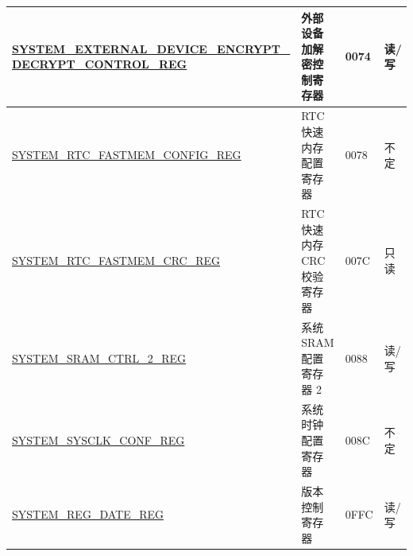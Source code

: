 \begin{longtable}{ | p{7cm} | p{7cm} | p{1.3cm} | p{1cm} | }
\hyperref[regdesc:SYSTEMEXTERNALDEVICEENCRYPTDECRYPTCONTROLREG]{SYSTEM\_EXTERNAL\_DEVICE\_ENCRYPT\_}  \hyperref[regdesc:SYSTEMEXTERNALDEVICEENCRYPTDECRYPTCONTROLREG]{DECRYPT\_CONTROL\_REG}  & \multirow{2}{*}{外部设备加解密控制寄存器} & \multirow{2}{*}{\hexprefix{}0074}  & \multirow{2}{*}{读/写} \\ \hline
\hyperref[regdesc:SYSTEMRTCFASTMEMCONFIGREG]{SYSTEM\_RTC\_FASTMEM\_CONFIG\_REG} & RTC 快速内存配置寄存器 & \hexprefix{}0078 & 不定 \\ \hline
\hyperref[regdesc:SYSTEMRTCFASTMEMCRCREG]{SYSTEM\_RTC\_FASTMEM\_CRC\_REG} & RTC 快速内存 CRC 校验寄存器 & \hexprefix{}007C & 只读\\ \hline
\hyperref[regdesc:SYSTEMSRAMCTRL2REG]{SYSTEM\_SRAM\_CTRL\_2\_REG} & 系统 SRAM 配置寄存器 2 & \hexprefix{}0088 & 读/写 \\ \hline
\hyperref[regdesc:SYSTEMSYSCLKCONFREG]{SYSTEM\_SYSCLK\_CONF\_REG} & 系统时钟配置寄存器 & \hexprefix{}008C & 不定 \\ \hline
\hyperref[regdesc:SYSTEMREGDATEREG]{SYSTEM\_REG\_DATE\_REG} & 版本控制寄存器 & \hexprefix{}0FFC & 读/写 \\ \hline
\end{longtable}
